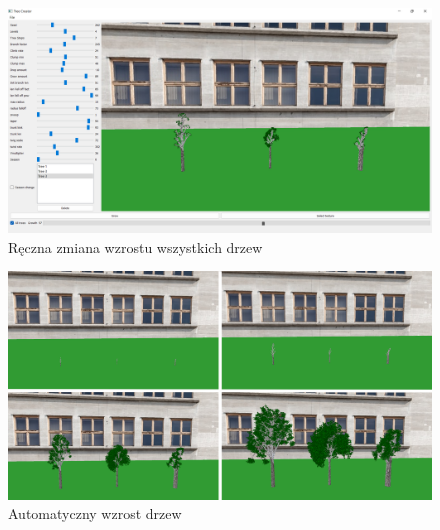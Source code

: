 \documentclass[a4paper,12pt,twoside]{book} %
\begin{document}
\begin{figure}[H]
	\centering\includegraphics[width=15.5cm]{grafika/program/percentGrow.png}
	\caption{Ręczna zmiana wzrostu wszystkich drzew}
    \label{fig:percentGrow}
\end{figure}







\begin{figure}[H]
	\centering\includegraphics[width=15.5cm]{grafika/program/AllGrow.png}
	\caption{Automatyczny wzrost drzew}
    \label{fig:growAll}
\end{figure}
\end{document}
